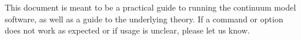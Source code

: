 
This document is meant to be a practical guide to running the continuum model software, as well as a guide to the underlying theory.
If a command or option does not work as expected or if usage is unclear, please let us know.


